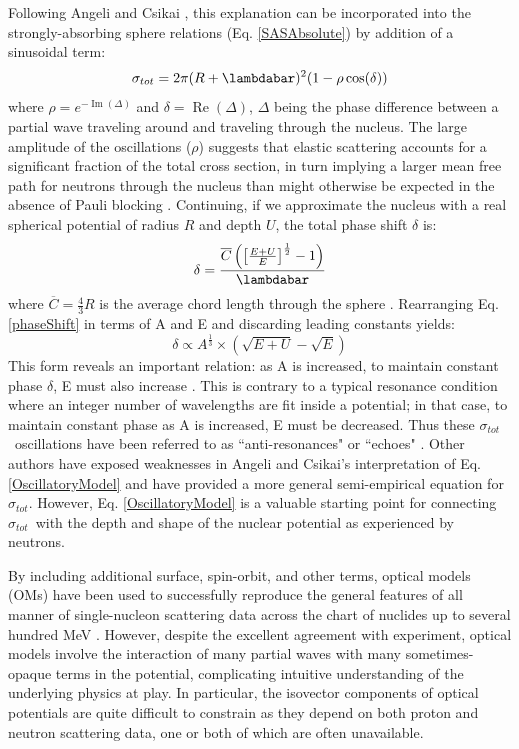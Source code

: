 \documentclass[twocolumn,secnumarabic,amssymb, nobibnotes, aps, prl,
superscriptaddress, nobalancelastpage]{revtex4}
\newcommand{\tot}{\ensuremath{\sigma_{tot}}}
\begin{document}
Following Angeli and Csikai \cite{Angeli1970}, this explanation can be
incorporated into the strongly-absorbing sphere relations (Eq. \ref{SASAbsolute}) 
by addition of a sinusoidal term:
\begin{equation} \label{OscillatoryModel}
    \tot = 2\pi (R+\lambdabar)^{2}(1 - \rho \cos(\delta))
\end{equation}
where $\rho = e^{-\operatorname{Im}(\Delta)}$ and $\delta =
\operatorname{Re}(\Delta)$, $\Delta$ being the phase difference between a
partial wave traveling
around and traveling through the nucleus. The large amplitude of the
oscillations ($\rho$) suggests that elastic scattering accounts for a
significant fraction of the total cross section, in turn implying a 
larger mean free path for neutrons through the nucleus 
than might otherwise be expected in the absence of Pauli blocking
\cite{Mohr1955, Feshbach1958}.
Continuing, if we approximate the nucleus with a
real spherical potential of radius $R$ and depth $U$, the total phase shift $\delta$ is:
\begin{equation} \label{phaseShift}
    \delta =
    \frac{\overline{C}\left(\left[{\frac{E+U}{E}}\right]^{\frac{1}{2}}-1\right)}{\lambdabar}
\end{equation}
where $\overline{C} = \frac{4}{3}R$ is the average chord length through the
sphere \cite{Angeli1970}. Rearranging Eq. \ref{phaseShift} in terms of A and E and
discarding leading constants yields:
\begin{equation}
    \delta \propto A^{\frac{1}{3}}\times\left(\sqrt{E+U}-\sqrt{E}\right)
\end{equation}
This form reveals an important relation: as A is increased, to maintain constant 
phase $\delta$, E must also increase \cite{Satchler1980, Peterson1962}. 
This is contrary to a typical resonance condition where an integer number of wavelengths
are fit inside a potential; in that case, to maintain constant phase as A is increased,
E must be decreased. Thus these \tot\ oscillations have been referred to as
``anti-resonances" or ``echoes" \cite{Satchler1980, McVoy1967}.
Other authors \cite{Ahmad1973} have
exposed weaknesses in Angeli and Csikai's interpretation of
Eq. \ref{OscillatoryModel} and have provided a more general semi-empirical
equation for \tot. However, Eq. \ref{OscillatoryModel} is a valuable starting
point for connecting \tot\ with the depth and shape of the nuclear
potential as experienced by neutrons.

By including additional surface, spin-orbit, and other terms, optical models (OMs) have been 
used to successfully reproduce the general features of all manner of single-nucleon scattering 
data across the chart of nuclides up to several hundred MeV \cite{Perey1976,
CH89, KoningDelaroche}. However, despite the excellent agreement with experiment, optical models
involve the interaction of many partial waves with many sometimes-opaque terms
in the potential, complicating intuitive understanding of the underlying
physics at play. In particular, the isovector components of optical potentials
are quite difficult to constrain as they depend on both proton and neutron 
scattering data, one or both of which are often unavailable.
\end{document}
